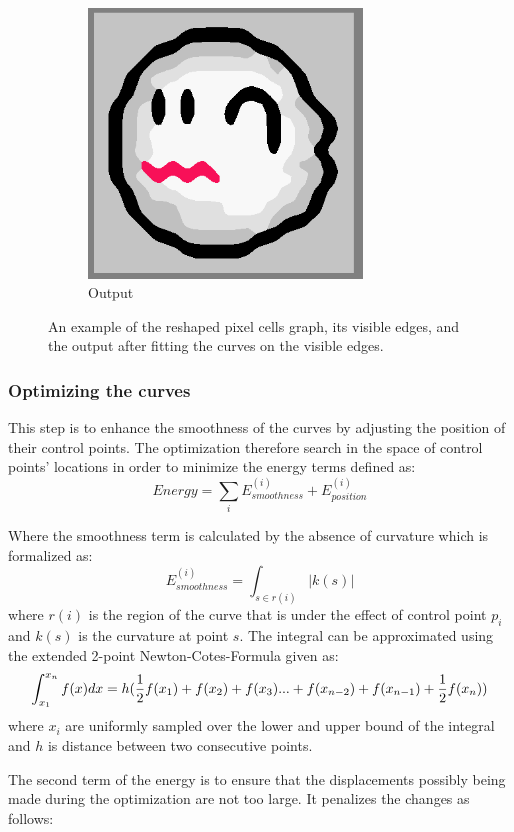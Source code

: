 \documentclass{article}
\begin{document}
\begin{figure}[h!]
\begin{subfigure}[b]{0.3\textwidth}
        \includegraphics[width=0.8\textwidth]{5}
        \caption{Output}
        \label{fig:vis}
    \end{subfigure}
    \caption{ An example of the reshaped pixel cells graph, its visible edges, and the output after fitting the curves on the visible edges.}
    \label{vis}
\end{figure}

\subsubsection{Optimizing the curves}
This step is to enhance the smoothness of the curves by adjusting the position of their control points. The optimization therefore search in the space of control points' locations in order to minimize the energy terms defined as:
\[ Energy = \sum_i E_{smoothness}^{(i)} + E_{position}^{(i)} \]

Where the smoothness term is calculated by the absence of curvature which is formalized as:
\[ E_{smoothness}^{(i)} = \int_{s\in r(i)} |k (s)| \]
where $r(i)$ is the region of the curve that is under the effect of control point $p_i$ and $k(s)$ is the curvature at point $s$.
The integral can be approximated using the extended 2-point Newton-Cotes-Formula given as:
\[ \int_{x_1}^{x_n} f(x) dx = h({1\over2} f(x_1)+f(x_2)+f(x_3)...+ f(x_{n-2})+f(x_{n-1}) + {1\over 2} f(x_n)) \]
 where $x_i$ are uniformly sampled over the lower and upper bound of the integral and $h$ is distance between two consecutive points.

The second term of the energy is to ensure that the displacements possibly being made during the optimization are not too large. It penalizes the changes as follows:
\end{document}

